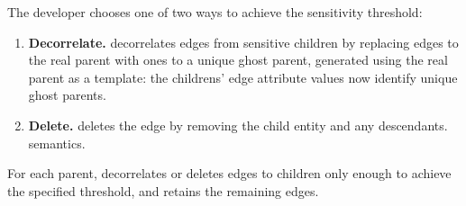 
The developer chooses one of two ways to achieve the sensitivity threshold: 
\begin{enumerate}
    \item \textbf{Decorrelate.}
    \sys decorrelates edges from sensitive children by replacing edges to the real parent with
        ones to a unique ghost parent, generated using the real parent as a template:
        the childrens' edge attribute values now identify unique ghost parents. 

\item \textbf{Delete.}
    \sys deletes the edge by removing the child entity and any descendants. 
    semantics.%
\end{enumerate}

For each parent, \sys decorrelates or deletes edges to children only enough to achieve the specified
threshold, and retains the remaining edges. 

\iffalse
